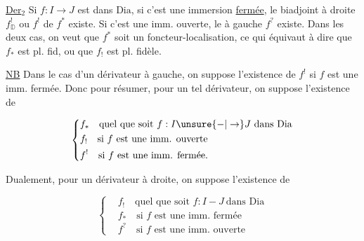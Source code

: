 
\uline{Der}$_{2}$ Si $f:I\longrightarrow J$ est dans $\mathrm{Dia}$, si c'est une immersion \uline{fermée}, le biadjoint à droite $f^{!}_{\mathbb D}$ ou $f^{!}$ de $f^{*}$ existe. Si c'est une imm. ouverte, le  à gauche $f^{?}$ existe. Dans les deux cas, on veut que $f^{*}$ soit un foncteur-localisation,  ce qui équivaut à dire que $f_{*}$ est pl. fid, ou que $f_{!}$ est pl. fidèle.



\uline{NB} Dans le cas d'un dérivateur à gauche, on suppose  l'existence de $f^{!}$ si $f$ est une imm. fermée. Donc pour résumer, pour un tel dérivateur, on suppose l'existence de

\[
\left\{\begin{aligned}
&f_{*}\quad\text{quel que soit }f:I\unsure{-|\to}J\ \text{dans }\mathrm{Dia}\\
&f_{!}\quad\text{si }f\text{ est une imm. ouverte}\\
&f^{!}\quad\text{si }f\text{ est une imm. fermée.}
\end{aligned}\right.
\]



Dualement, pour un dérivateur à droite, on suppose l'existence de

\[
\left\{\begin{aligned}
&f_{!}\quad\text{quel que soit }f:I-J\ \text{dans }\mathrm{Dia}\\
&f_{*}\quad\text{si }f\text{ est une imm. fermée}\\
&f^{?}\quad\text{si }f\text{ est une imm. ouverte}
\end{aligned}\right.
\]

